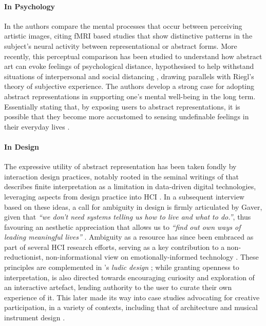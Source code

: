 \paragraph{In Psychology}

In \cite{aviv_what_2014} the authors compare the mental processes that occur between perceiving artistic images, citing fMRI based studies that show distinctive patterns in the subject's neural activity between representational or abstract forms. More recently, this perceptual comparison has been studied to understand how abstract art can evoke feelings of psychological distance, hypothesised to help withstand situations of interpersonal and social distancing \cite{durkin_objective_2020}, drawing parallels with Riegl's theory of subjective experience. The authors develop a strong case for adopting abstract representations in supporting one's mental well-being in the long term. Essentially stating that, by exposing users to abstract representations, it is possible that they become more accustomed to sensing undefinable feelings in their everyday lives \cite{durkin_objective_2020}.


\paragraph{In Design}

The expressive utility of abstract representation has been taken fondly by interaction design practices, notably rooted in the seminal writings of \citeauthor{gaver_ambiguity_2003} that describes finite interpretation as a limitation in data-driven digital technologies, leveraging aspects from design practice into HCI \cite{gaver_ambiguity_2003}. In a subsequent interview based on these ideas, a call for ambiguity in design is firmly articulated by Gaver, given that \textit{``we don’t need systems telling us how to live and what to do.''}, thus favouring an aesthetic appreciation that allows us to \textit{``find out own ways of leading meaningful lives''} \cite{gaver_gaffney_2007}. Ambiguity as a resource has since been embraced as part of several HCI research efforts, serving as a key contribution to a non-reductionist, non-informational view on emotionally-informed technology \cite{sanches_ambiguity_2019,howell_biosignals_2016,stahl_evocative_2014}. These principles are complemented in \citeauthor{gaver_drift_2004}'s \textit{ludic design} \cite{gaver_drift_2004}; while granting openness to interpretation, is also directed towards encouraging curiosity and exploration of an interactive artefact, lending authority to the user to curate their own experience of it. This later made its way into case studies advocating for creative participation, in a variety of contexts, including that of architecture and musical instrument design \cite{harriss_ludic_2010,mcpherson_designing_2016}.


